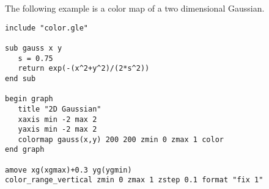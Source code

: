The following example is a color map of a two dimensional Gaussian.

\preglegraph{}
\begin{minipage}[c]{8cm}
\begin{Verbatim}
include "color.gle"

sub gauss x y
   s = 0.75
   return exp(-(x^2+y^2)/(2*s^2))
end sub

begin graph
   title "2D Gaussian"
   xaxis min -2 max 2
   yaxis min -2 max 2
   colormap gauss(x,y) 200 200 zmin 0 zmax 1 color
end graph

amove xg(xgmax)+0.3 yg(ygmin)
color_range_vertical zmin 0 zmax 1 zstep 0.1 format "fix 1"
\end{Verbatim}
\end{minipage}
\hfill
\begin{minipage}[c]{7cm}
\ifdefined\APPLE
\else
\mbox{}
\fi
\end{minipage}
\postglegraph{}
